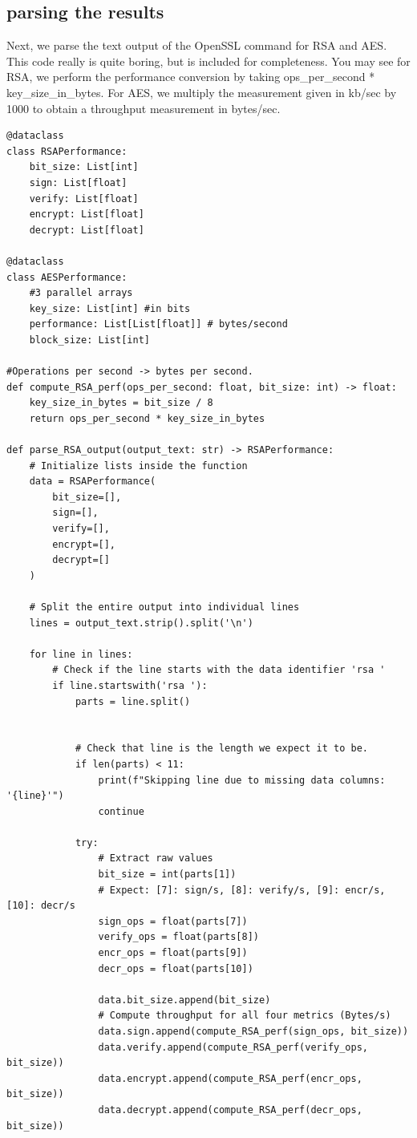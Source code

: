 \documentclass[11pt]{article}
\begin{document}
\subsection*{parsing the results}
Next, we parse the text output of the OpenSSL command for RSA and AES. This code really is quite boring, but is included for completeness. You may see for RSA, we perform the performance conversion by taking ops\_per\_second * key\_size\_in\_bytes. For AES, we multiply the measurement given in kb/sec by 1000 to obtain a throughput measurement in bytes/sec.
\begin{framed}
\begin{verbatim}
@dataclass
class RSAPerformance:
    bit_size: List[int]
    sign: List[float]
    verify: List[float]
    encrypt: List[float]
    decrypt: List[float] 

@dataclass
class AESPerformance:
    #3 parallel arrays
    key_size: List[int] #in bits
    performance: List[List[float]] # bytes/second
    block_size: List[int]

#Operations per second -> bytes per second.
def compute_RSA_perf(ops_per_second: float, bit_size: int) -> float:
    key_size_in_bytes = bit_size / 8
    return ops_per_second * key_size_in_bytes

def parse_RSA_output(output_text: str) -> RSAPerformance:
    # Initialize lists inside the function
    data = RSAPerformance(
        bit_size=[],
        sign=[],
        verify=[],
        encrypt=[],
        decrypt=[]
    )

    # Split the entire output into individual lines
    lines = output_text.strip().split('\n')

    for line in lines:
        # Check if the line starts with the data identifier 'rsa '
        if line.startswith('rsa '):
            parts = line.split()

            
            # Check that line is the length we expect it to be.
            if len(parts) < 11:
                print(f"Skipping line due to missing data columns: '{line}'")
                continue
                 
            try:
                # Extract raw values
                bit_size = int(parts[1])
                # Expect: [7]: sign/s, [8]: verify/s, [9]: encr/s, [10]: decr/s
                sign_ops = float(parts[7])
                verify_ops = float(parts[8])
                encr_ops = float(parts[9])
                decr_ops = float(parts[10])

                data.bit_size.append(bit_size)
                # Compute throughput for all four metrics (Bytes/s)
                data.sign.append(compute_RSA_perf(sign_ops, bit_size))
                data.verify.append(compute_RSA_perf(verify_ops, bit_size))
                data.encrypt.append(compute_RSA_perf(encr_ops, bit_size))
                data.decrypt.append(compute_RSA_perf(decr_ops, bit_size))


\end{verbatim}
\end{framed}
\end{document}
